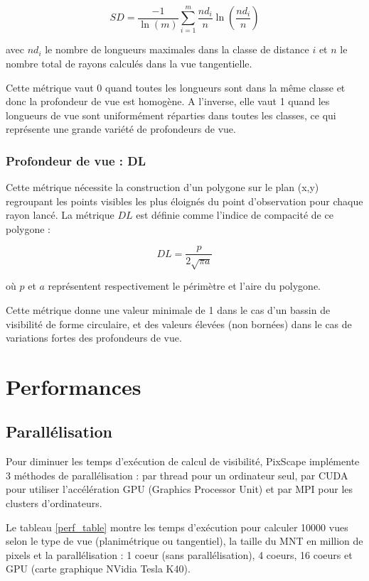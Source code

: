 \documentclass{report}
\begin{document}
$$SD = \frac{-1}{\ln(m)}\sum_{i=1}^{m}\frac{nd_i}{n}\ln\left(\frac{nd_i}{n}\right)$$

avec $nd_i$ le nombre de longueurs maximales dans la classe de distance $i$ et $n$ le nombre total de rayons calculés dans la vue tangentielle.

Cette métrique vaut 0 quand toutes les longueurs sont dans la même classe et donc la profondeur de vue est homogène. A l’inverse, elle vaut 1 quand les longueurs de vue sont uniformément réparties dans toutes les classes, ce qui représente une grande variété de profondeurs de vue.

\subsection{Profondeur de vue : DL}
Cette métrique nécessite la construction d’un polygone sur le plan (x,y) regroupant les points visibles les plus éloignés du point d’observation pour chaque rayon lancé. La métrique $DL$ est définie comme l’indice de compacité de ce polygone : 

$$DL=\frac{p}{2\sqrt{\pi a}}$$

où $p$ et $a$ représentent respectivement le périmètre et l’aire du polygone. 

Cette métrique donne une valeur minimale de 1 dans le cas d’un bassin de visibilité de forme circulaire, et des valeurs élevées (non bornées) dans le cas de variations fortes des profondeurs de vue.


\chapter{Performances}
\label{perf}

\section{Parallélisation}
\label{parallelism}
Pour diminuer les temps d'exécution de calcul de visibilité, PixScape implémente 3 méthodes de parallélisation : par thread pour un ordinateur seul, par CUDA pour utiliser l'accélération GPU (Graphics Processor Unit) et par MPI pour les clusters d'ordinateurs.

Le tableau \ref{perf_table} montre les temps d'exécution pour calculer 10000 vues selon le type de vue (planimétrique ou tangentiel), la taille du MNT en million de pixels et la parallélisation : 1 coeur (sans parallélisation), 4 coeurs, 16 coeurs et GPU (carte graphique NVidia Tesla K40).
\end{document}
